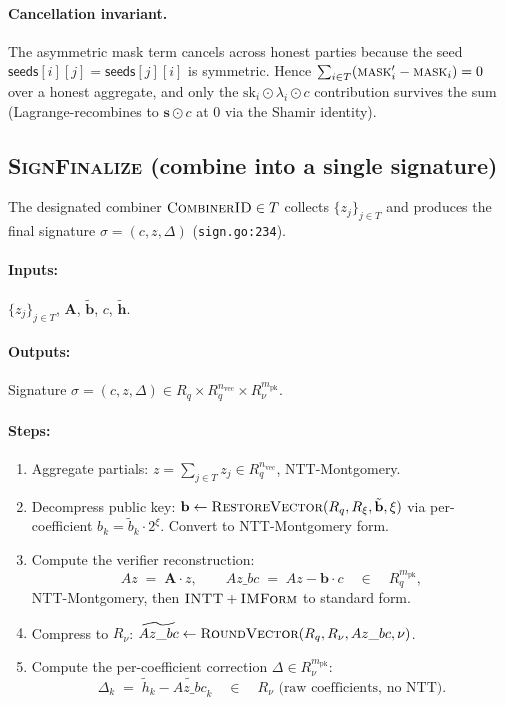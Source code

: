 \paragraph{Cancellation invariant.} The asymmetric mask term cancels
across honest parties because the seed $\mathsf{seeds}[i][j] =
\mathsf{seeds}[j][i]$ is symmetric. Hence
$\sum_{i \in T} (\textsc{mask}'_i - \textsc{mask}_i) = 0$ over a
honest aggregate, and only the $\mathrm{sk}_i \odot \lambda_i \odot c$
contribution survives the sum (Lagrange-recombines to $\mathbf{s}
\odot c$ at $0$ via the Shamir identity).

\subsection{\textsc{SignFinalize} (combine into a single signature)}
\label{sec:protocol:finalize}

The designated combiner $\textsc{CombinerID} \in T$ collects
$\{z_j\}_{j \in T}$ and produces the final signature
$\sigma = (c, z, \Delta)$ (\texttt{sign.go:234}).

\paragraph{Inputs:} $\{z_j\}_{j \in T}$, $\mathbf{A}$,
$\tilde{\mathbf{b}}$, $c$, $\tilde{\mathbf{h}}$.

\paragraph{Outputs:} Signature
$\sigma = (c, z, \Delta) \in R_q \times R_q^{n_{\mathrm{vec}}} \times
R_\nu^{m_{\mathrm{pk}}}$.

\paragraph{Steps:}
\begin{enumerate}[leftmargin=2em, nosep]
\item Aggregate partials: $z = \sum_{j \in T} z_j \in R_q^{n_{\mathrm{vec}}}$,
      NTT-Montgomery.
\item Decompress public key:
      $\mathbf{b} \leftarrow \textsc{RestoreVector}(R_q, R_\xi,
      \tilde{\mathbf{b}}, \xi)$ via per-coefficient $b_k = \tilde b_k
      \cdot 2^\xi$. Convert to NTT-Montgomery form.
\item Compute the verifier reconstruction:
      \[
        Az \;=\; \mathbf{A} \cdot z, \qquad
        Az\_bc \;=\; Az - \mathbf{b} \cdot c
        \quad \in \quad R_q^{m_{\mathrm{pk}}},
      \]
      NTT-Montgomery, then $\textsc{INTT} + \textsc{IMForm}$ to
      standard form.
\item Compress to $R_\nu$:
      $\widetilde{Az\_bc} \leftarrow \textsc{RoundVector}(R_q, R_\nu,
      Az\_bc, \nu)$.
\item Compute the per-coefficient correction $\Delta \in
      R_\nu^{m_{\mathrm{pk}}}$:
      \[
        \Delta_k \;=\; \tilde h_k - \widetilde{Az\_bc}_k
        \quad \in \quad R_\nu \text{ (raw coefficients, no NTT).}
      \]
\end{enumerate}

